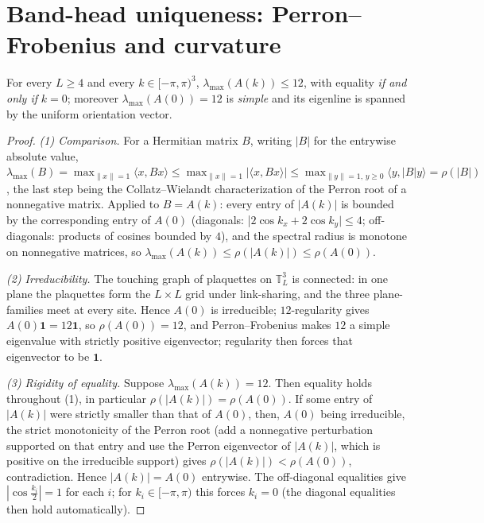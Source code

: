 \section{Band-head uniqueness: Perron--Frobenius and curvature}
\label{app:E}
\begin{lemma}\label{lem:headE}
For every $L\ge4$ and every $k\in[-\pi,\pi)^3$,
$\lambda_{\max}(A(k))\le12$, with equality \emph{if and only if} $k=0$;
moreover $\lambda_{\max}(A(0))=12$ is \emph{simple} and its eigenline is
spanned by the uniform orientation vector.
\end{lemma}
\begin{proof}
\emph{(1) Comparison.} For a Hermitian matrix $B$, writing $|B|$ for the
entrywise absolute value,
$\lambda_{\max}(B)=\max_{\|x\|=1}\langle x,Bx\rangle\le
\max_{\|x\|=1}|\langle x,Bx\rangle|\le
\max_{\|y\|=1,\,y\ge0}\langle y,|B|y\rangle=\rho(|B|)$,
the last step being the Collatz--Wielandt characterization of the Perron
root of a nonnegative matrix. Applied to $B=A(k)$: every entry of $|A(k)|$
is bounded by the corresponding entry of $A(0)$ (diagonals:
|$2\cos k_x+2\cos k_y|\le4$; off-diagonals: products of cosines bounded by
$4$), and the spectral radius is monotone on nonnegative matrices, so
$\lambda_{\max}(A(k))\le\rho(|A(k)|)\le\rho(A(0))$.

\emph{(2) Irreducibility.} The touching graph of plaquettes on $\mathbb T_L^3$
is connected: in one plane the plaquettes form the $L\times L$ grid under
link-sharing, and the three plane-families meet at every site. Hence $A(0)$
is irreducible; $12$-regularity gives $A(0)\mathbf1=12\mathbf1$, so
$\rho(A(0))=12$, and Perron--Frobenius makes $12$ a simple eigenvalue with
strictly positive eigenvector; regularity then forces that eigenvector to be
$\mathbf1$.

\emph{(3) Rigidity of equality.} Suppose $\lambda_{\max}(A(k))=12$. Then
equality holds throughout (1), in particular $\rho(|A(k)|)=\rho(A(0))$. If
some entry of $|A(k)|$ were strictly smaller than that of $A(0)$, then,
$A(0)$ being irreducible, the strict monotonicity of the Perron root (add a
nonnegative perturbation supported on that entry and use the Perron eigenvector
of $|A(k)|$, which is positive on the irreducible support) gives
$\rho(|A(k)|)<\rho(A(0))$, contradiction. Hence $|A(k)|=A(0)$ entrywise.
The off-diagonal equalities give $|\cos\tfrac{k_i}{2}|=1$ for each $i$;
for $k_i\in[-\pi,\pi)$ this forces $k_i=0$ (the diagonal equalities then
hold automatically).
\end{proof}

